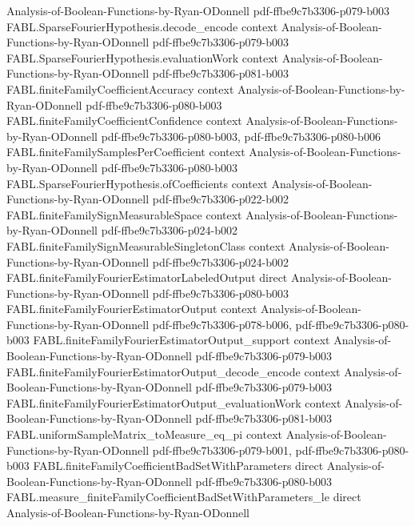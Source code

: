 \begin{theorem}
  {Analysis-of-Boolean-Functions-by-Ryan-ODonnell}
  {pdf-ffbe9c7b3306-p079-b003}
\proofstep
  {FABL.SparseFourierHypothesis.decode_encode}
  {context}
  {Analysis-of-Boolean-Functions-by-Ryan-ODonnell}
  {pdf-ffbe9c7b3306-p079-b003}
\proofstep
  {FABL.SparseFourierHypothesis.evaluationWork}
  {context}
  {Analysis-of-Boolean-Functions-by-Ryan-ODonnell}
  {pdf-ffbe9c7b3306-p081-b003}
\proofstep
  {FABL.finiteFamilyCoefficientAccuracy}
  {context}
  {Analysis-of-Boolean-Functions-by-Ryan-ODonnell}
  {pdf-ffbe9c7b3306-p080-b003}
\proofstep
  {FABL.finiteFamilyCoefficientConfidence}
  {context}
  {Analysis-of-Boolean-Functions-by-Ryan-ODonnell}
  {pdf-ffbe9c7b3306-p080-b003,
    pdf-ffbe9c7b3306-p080-b006}
\proofstep
  {FABL.finiteFamilySamplesPerCoefficient}
  {context}
  {Analysis-of-Boolean-Functions-by-Ryan-ODonnell}
  {pdf-ffbe9c7b3306-p080-b003}
\proofstep
  {FABL.SparseFourierHypothesis.ofCoefficients}
  {context}
  {Analysis-of-Boolean-Functions-by-Ryan-ODonnell}
  {pdf-ffbe9c7b3306-p022-b002}
\proofstep
  {FABL.finiteFamilySignMeasurableSpace}
  {context}
  {Analysis-of-Boolean-Functions-by-Ryan-ODonnell}
  {pdf-ffbe9c7b3306-p024-b002}
\proofstep
  {FABL.finiteFamilySignMeasurableSingletonClass}
  {context}
  {Analysis-of-Boolean-Functions-by-Ryan-ODonnell}
  {pdf-ffbe9c7b3306-p024-b002}
\proofstep
  {FABL.finiteFamilyFourierEstimatorLabeledOutput}
  {direct}
  {Analysis-of-Boolean-Functions-by-Ryan-ODonnell}
  {pdf-ffbe9c7b3306-p080-b003}
\proofstep
  {FABL.finiteFamilyFourierEstimatorOutput}
  {context}
  {Analysis-of-Boolean-Functions-by-Ryan-ODonnell}
  {pdf-ffbe9c7b3306-p078-b006,
    pdf-ffbe9c7b3306-p080-b003}
\proofstep
  {FABL.finiteFamilyFourierEstimatorOutput_support}
  {context}
  {Analysis-of-Boolean-Functions-by-Ryan-ODonnell}
  {pdf-ffbe9c7b3306-p079-b003}
\proofstep
  {FABL.finiteFamilyFourierEstimatorOutput_decode_encode}
  {context}
  {Analysis-of-Boolean-Functions-by-Ryan-ODonnell}
  {pdf-ffbe9c7b3306-p079-b003}
\proofstep
  {FABL.finiteFamilyFourierEstimatorOutput_evaluationWork}
  {context}
  {Analysis-of-Boolean-Functions-by-Ryan-ODonnell}
  {pdf-ffbe9c7b3306-p081-b003}
\proofstep
  {FABL.uniformSampleMatrix_toMeasure_eq_pi}
  {context}
  {Analysis-of-Boolean-Functions-by-Ryan-ODonnell}
  {pdf-ffbe9c7b3306-p079-b001,
    pdf-ffbe9c7b3306-p080-b003}
\proofstep
  {FABL.finiteFamilyCoefficientBadSetWithParameters}
  {direct}
  {Analysis-of-Boolean-Functions-by-Ryan-ODonnell}
  {pdf-ffbe9c7b3306-p080-b003}
\proofstep
  {FABL.measure_finiteFamilyCoefficientBadSetWithParameters_le}
  {direct}
  {Analysis-of-Boolean-Functions-by-Ryan-ODonnell}

\end{theorem}
